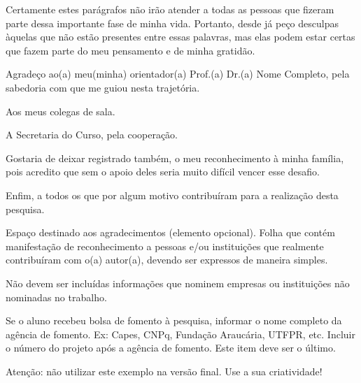 
\begin{agradecimentos}%
\color{red}
Certamente estes parágrafos não irão atender a todas as pessoas que fizeram parte dessa importante fase de minha vida. Portanto, desde já peço desculpas àquelas que não estão presentes entre essas palavras, mas elas podem estar certas que fazem parte do meu pensamento e de minha gratidão. 

Agradeço ao(a) meu(minha) orientador(a) Prof.(a) Dr.(a) Nome Completo, pela sabedoria com que me guiou nesta trajetória.

Aos meus colegas de sala.

A Secretaria do Curso, pela cooperação.

Gostaria de deixar registrado também, o meu reconhecimento à minha família, pois acredito que sem o apoio deles seria muito difícil vencer esse desafio. 

Enfim, a todos os que por algum motivo contribuíram para a realização desta pesquisa.


Espaço destinado aos agradecimentos (elemento opcional). Folha que contém manifestação de reconhecimento a pessoas e/ou instituições que realmente contribuíram com o(a) autor(a), devendo ser expressos de maneira simples.

Não devem ser incluídas informações que nominem empresas ou instituições não nominadas no trabalho.

Se o aluno recebeu bolsa de fomento à pesquisa, informar o nome completo da agência de fomento. Ex: Capes, CNPq, Fundação Araucária, UTFPR, etc. Incluir o número do projeto após a agência de fomento. Este item deve ser o último.

Atenção: não utilizar este exemplo na versão final. Use a sua criatividade!
\color{black}
\end{agradecimentos}
